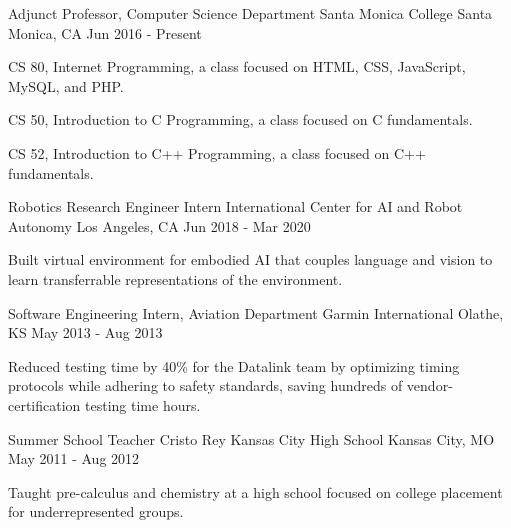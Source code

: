 


\begin{cventries}



\cventry
{Adjunct Professor, Computer Science Department}
{Santa Monica College}
{Santa Monica, CA}
{Jun 2016 - Present}
{
\begin{cvitems}
\item CS 80, Internet Programming, a class focused on HTML, CSS, JavaScript, MySQL, and PHP.
\item CS 50, Introduction to C Programming, a class focused on C fundamentals.
\item CS 52, Introduction to C++ Programming, a class focused on C++ fundamentals.
\end{cvitems}
}


\cventry
{Robotics Research Engineer Intern}
{International Center for AI and Robot Autonomy}
{Los Angeles, CA}
{Jun 2018 - Mar 2020}
{
\begin{cvitems}
\item Built virtual environment for embodied AI that couples language and vision to learn transferrable representations of the environment.
\end{cvitems}
}


\cventry
{Software Engineering Intern, Aviation Department}
{Garmin International}
{Olathe, KS}
{May 2013 - Aug 2013}
{
\begin{cvitems}
\item Reduced testing time by 40\% for the Datalink team by optimizing timing protocols while adhering to safety standards, saving hundreds of vendor-certification testing time hours.
\end{cvitems}
}


\cventry
{Summer School Teacher}
{Cristo Rey Kansas City High School}
{Kansas City, MO}
{May 2011 - Aug 2012}
{
\begin{cvitems}
\item Taught pre-calculus and chemistry at a high school focused on college placement for underrepresented groups.
\end{cvitems}
}

\end{cventries}
